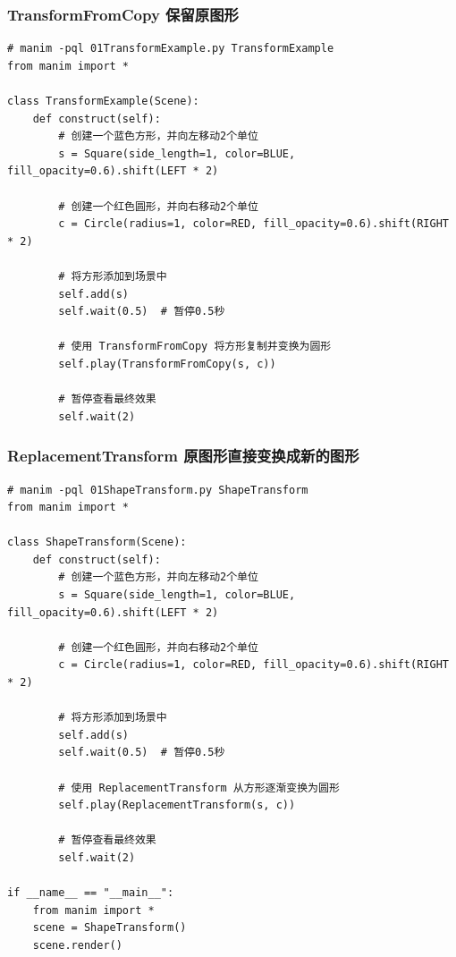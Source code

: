 \subsubsection{TransformFromCopy 保留原图形}
\label{subsubsec:manim_animation_transform_shape_transformfromcopy}

\begin{lstlisting}[style=pythonstyle]
# manim -pql 01TransformExample.py TransformExample
from manim import *

class TransformExample(Scene):
    def construct(self):
        # 创建一个蓝色方形，并向左移动2个单位
        s = Square(side_length=1, color=BLUE, fill_opacity=0.6).shift(LEFT * 2)

        # 创建一个红色圆形，并向右移动2个单位
        c = Circle(radius=1, color=RED, fill_opacity=0.6).shift(RIGHT * 2)

        # 将方形添加到场景中
        self.add(s)
        self.wait(0.5)  # 暂停0.5秒

        # 使用 TransformFromCopy 将方形复制并变换为圆形
        self.play(TransformFromCopy(s, c))

        # 暂停查看最终效果
        self.wait(2)
\end{lstlisting}        

\subsubsection{ReplacementTransform 原图形直接变换成新的图形}
\label{subsubsec:manim_animation_transform_shape_replacementtransform}

\begin{lstlisting}[style=pythonstyle]
# manim -pql 01ShapeTransform.py ShapeTransform
from manim import *

class ShapeTransform(Scene):
    def construct(self):
        # 创建一个蓝色方形，并向左移动2个单位
        s = Square(side_length=1, color=BLUE, fill_opacity=0.6).shift(LEFT * 2)
        
        # 创建一个红色圆形，并向右移动2个单位
        c = Circle(radius=1, color=RED, fill_opacity=0.6).shift(RIGHT * 2)
        
        # 将方形添加到场景中
        self.add(s)
        self.wait(0.5)  # 暂停0.5秒
        
        # 使用 ReplacementTransform 从方形逐渐变换为圆形
        self.play(ReplacementTransform(s, c))
        
        # 暂停查看最终效果
        self.wait(2)

if __name__ == "__main__":
    from manim import *
    scene = ShapeTransform()
    scene.render()
\end{lstlisting}  

